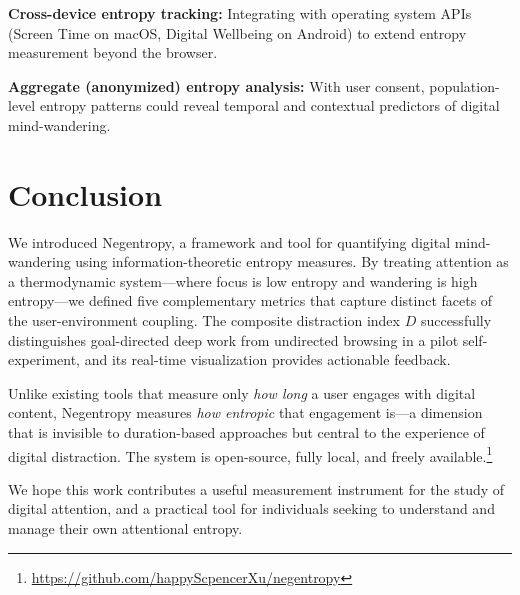 \documentclass[10pt,letterpaper]{article}
\begin{document}
\textbf{Cross-device entropy tracking:} Integrating with operating system APIs (Screen Time on macOS, Digital Wellbeing on Android) to extend entropy measurement beyond the browser.

\textbf{Aggregate (anonymized) entropy analysis:} With user consent, population-level entropy patterns could reveal temporal and contextual predictors of digital mind-wandering.

\section{Conclusion}
\label{sec:conclusion}

We introduced Negentropy, a framework and tool for quantifying digital mind-wandering using information-theoretic entropy measures. By treating attention as a thermodynamic system---where focus is low entropy and wandering is high entropy---we defined five complementary metrics that capture distinct facets of the user-environment coupling. The composite distraction index $D$ successfully distinguishes goal-directed deep work from undirected browsing in a pilot self-experiment, and its real-time visualization provides actionable feedback.

Unlike existing tools that measure only \emph{how long} a user engages with digital content, Negentropy measures \emph{how entropic} that engagement is---a dimension that is invisible to duration-based approaches but central to the experience of digital distraction. The system is open-source, fully local, and freely available.\footnote{\url{https://github.com/happyScpencerXu/negentropy}}

We hope this work contributes a useful measurement instrument for the study of digital attention, and a practical tool for individuals seeking to understand and manage their own attentional entropy.

\end{document}
